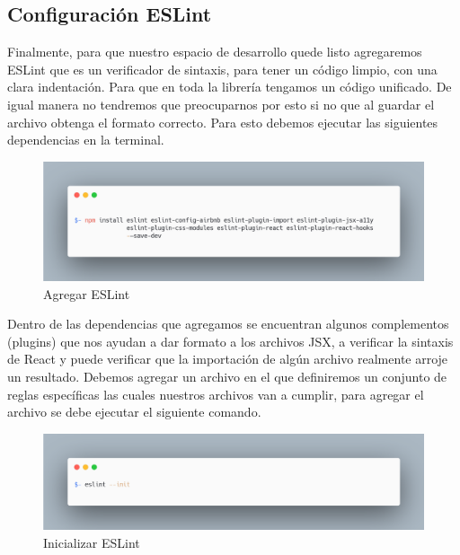     \subsection{Configuración ESLint }
    Finalmente, para que nuestro espacio de desarrollo quede listo agregaremos ESLint que es un verificador de sintaxis, para tener un código limpio, con una clara indentación. Para que en toda la librería tengamos un código unificado. De igual manera no tendremos que preocuparnos por esto si no que al guardar el archivo obtenga el formato correcto.
    Para esto debemos ejecutar las siguientes dependencias en la terminal.
    \newline
    \newline
     \begin{figure}[H]
    \includegraphics[width=1\textwidth]{./Imagenes/image14.png}
    \caption[Agregar ESLint]{Agregar ESLint}
    \end{figure}
    \newline
    \newline
    Dentro de las dependencias que agregamos se encuentran algunos complementos (plugins) que nos ayudan a dar formato a los archivos JSX, a verificar la sintaxis de React y  puede verificar que la importación de algún archivo realmente arroje un resultado.
    Debemos agregar un archivo en el que definiremos un conjunto de reglas específicas las cuales nuestros archivos van a cumplir, para agregar el archivo se debe ejecutar el siguiente comando.
    \newline
    \newline
     \begin{figure}[H]
    \includegraphics[width=1\textwidth]{./Imagenes/image32.png}
    \caption[Inicializar ESLint]{Inicializar ESLint}
    \end{figure}
